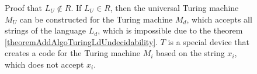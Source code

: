 \begin{figure}
\centering



\caption{Proof that $L_U \notin R$. 
  If $L_U \in R$, then the universal Turing machine $M_U$ can be
  constructed for the Turing machine $M_d$, which accepts all strings
  of the language $L_d$, which is impossible due to the theorem 
  \ref{theoremAddAlgoTuringLdUndecidability}. $T$ is a special
  device that creates a code for the Turing machine
  $M_i$ based on the string $x_i$, which does not accept $x_i$.}
\label{figAddAlgoUTuringProof}
\end{figure}